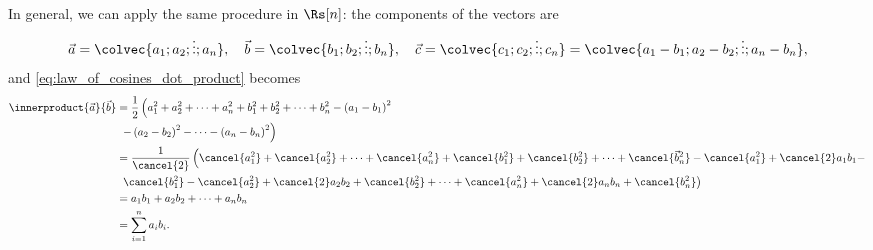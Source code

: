 In general, we can apply the same procedure in $\Rs[n]$: the components of the vectors are
\begin{equation}
	\vec{a} = \colvec{a_{1};a_{2};\vdots;a_{n}},\quad \vec{b} = \colvec{b_{1};b_{2};\vdots;b_{n}},\quad \vec{c} = \colvec{c_{1};c_{2};\vdots;c_{n}} = \colvec{a_{1}-b_{1};a_{2}-b_{2};\vdots;a_{n}-b_{n}},
	\label{eq:law_of_cosines_vector_components_3}
\end{equation}
and \autoref{eq:law_of_cosines_dot_product} becomes
\begin{equation}
	\begin{aligned}
		\innerproduct{\vec{a}}{\vec{b}} & = \frac{1}{2}\left(a_{1}^{2}+a_{2}^{2}+\dots+a_{n}^{2} + b_{1}^{2}+b_{2}^{2}+\dots+b_{n}^{2}-\left(a_{1}-b_{1}\right)^{2}\right.                                                                                      \\
		                                & \ \left.-\left(a_{2}-b_{2}\right)^{2}-\dots-\left(a_{n}-b_{n}\right)^{2}\right)                                                                                                                                       \\
		                                & = \frac{1}{\cancel{2}}\left(\cancel{a_{1}^{2}}+\cancel{a_{2}^{2}}+\dots+\cancel{a_{n}^{2}} + \cancel{b_{1}^{2}}+\cancel{b_{2}^{2}} + \dots + \cancel{\vec{b}_{n}^{2}}-\cancel{a_{1}^{2}}+\cancel{2}a_{1}b_{1}-\right. \\
		                                & \ \left.\cancel{b_{1}^{2}}-\cancel{a_{2}^{2}}+\cancel{2}a_{2}b_{2}+\cancel{b_{2}^{2}} + \dots + \cancel{a_{n}^{2}}+\cancel{2}a_{n}b_{n}+\cancel{b_{n}^{2}}\right)                                                     \\
		                                & = a_{1}b_{1} + a_{2}b_{2} + \dots + a_{n}{b_{n}}                                                                                                                                                                      \\
		                                & = \sum\limits_{i=1}^{n}a_{i}b_{i}.
	\end{aligned}
	\label{eq:law_of_cosines_vector_components_4}
\end{equation}

